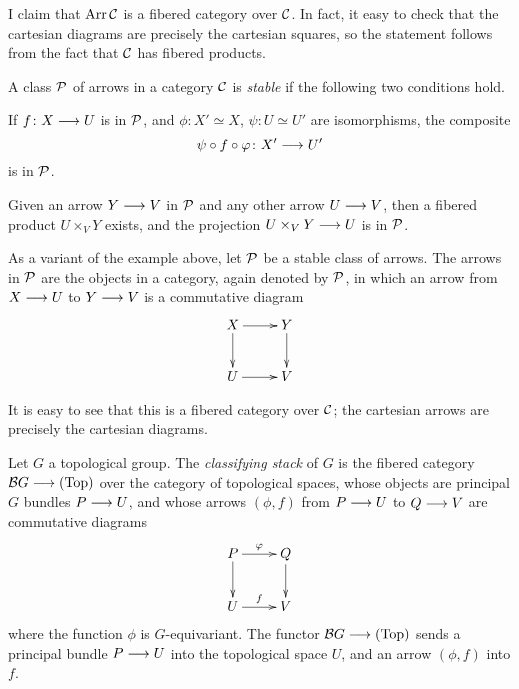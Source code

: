 \begin{3   FIBERED CATEGORIES}
\begin{3.2 Examples of fibered categories}
\begin{example}
I claim that $\operatorname{Arr} \mathcal{C}$ is a fibered category over $\mathcal{C}$. In fact, it easy to check that the cartesian diagrams are precisely the cartesian squares, so the statement follows from the fact that $\mathcal{C}$ has fibered products.

\end{example}

\begin{definition}\label{def:stable-class}
A class $\mathcal{P}$ of arrows in a category $\mathcal{C}$ is \emph{stable} if the following two conditions hold.

\begin{enumeratea}

\item If $f \colon X \arr U$ is in $\mathcal{P}$, and $\phi \colon X' \simeq X$, $\psi \colon U \simeq U'$ are isomorphisms, the composite
   \[
  \psi \circ f \circ \phi \colon  X' \arr U'
   \]
is in $\mathcal{P}$.

\item Given an arrow $Y \arr V$ in $\mathcal{P}$ and any other arrow $U \arr V$, then a fibered product $U \times_V Y$ exists, and the projection $U \times_V Y \arr U$ is in $\mathcal{P}$.

\end{enumeratea} 
\end{definition}

\begin{example}\label{ex:restrictedarrows} As a variant of the
example above, let $\mathcal{P}$ be a stable class of arrows. The arrows in $\mathcal{P}$ are the objects in a category, again denoted by $\mathcal{P}$, in which an arrow from $X \arr U$ to $Y \arr V$ is a commutative diagram
   \[
   \xymatrix{
   X \ar[r]\ar[d] & Y \ar[d] \\
   U \ar[r]       & V        \\
   }
   \]

It is easy to see that this is a fibered category over $\mathcal{C}$; the cartesian arrows are precisely the cartesian diagrams.

\end{example}


\begin{example}\label{ex:classifying} Let $G$ a topological group. The \emph{classifying stack} of $G$ is the fibered category $\cB G \arr \cattop$ over the category of topological spaces, whose objects are principal $G$ bundles $P \arr U$, and whose arrows $(\phi, f)$ from $P \arr U$ to $Q \arr V$  are commutative diagrams
   \[
   \xymatrix{
   P\ar[r]^\phi\ar[d] & Q\ar[d]\\
   U\ar[r]^f & V
   }
   \]
where the function $\phi$ is $G$-equivariant. The functor $\cB G \arr \cattop$ sends a principal bundle $P \arr U$ into the topological space $U$,  and an arrow $(\phi, f)$ into $f$.


\end{example}
\end{3.2 Examples of fibered categories}
\end{3   FIBERED CATEGORIES}
